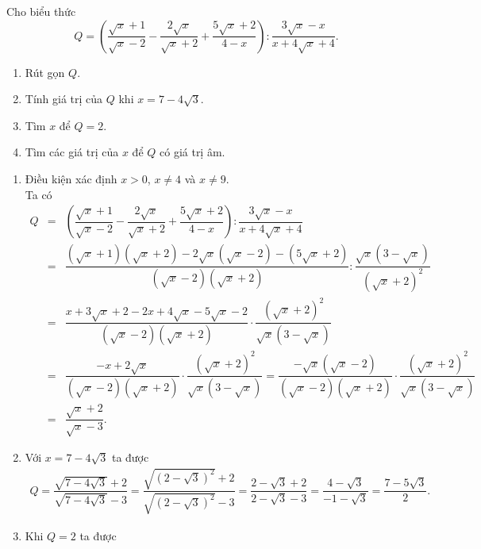 \begin{bt}%
	Cho biểu thức
	$$Q=\left(\dfrac{\sqrt{x}+1}{\sqrt{x}-2} - \dfrac{2\sqrt{x}}{\sqrt{x}+2} + \dfrac{5\sqrt{x}+2}{4-x}\right) : \dfrac{3\sqrt{x}-x}{x+4\sqrt{x}+4}.$$
	\begin{enumerate}
		\item Rút gọn $Q$.
		\item Tính giá trị của $Q$ khi $x=7-4\sqrt{3}$.
		\item Tìm $x$ để $Q=2$.
		\item Tìm các giá trị của $x$ để $Q$ có giá trị âm.
	\end{enumerate}
	\loigiai
	{
		\begin{enumerate}
			\item Điều kiện xác định $x>0$, $x \neq 4$ và $x \neq 9$.\\
			Ta có
			\allowdisplaybreaks
			\begin{eqnarray*}
				Q &=& \left(\dfrac{\sqrt{x}+1}{\sqrt{x}-2} - \dfrac{2\sqrt{x}}{\sqrt{x}+2} + \dfrac{5\sqrt{x}+2}{4-x}\right) : \dfrac{3\sqrt{x}-x}{x+4\sqrt{x}+4}\\
				&=& \dfrac{\left(\sqrt{x}+1\right)\left(\sqrt{x}+2\right) - 2\sqrt{x}\left(\sqrt{x}-2\right) - \left(5\sqrt{x}+2\right)}{\left(\sqrt{x}-2\right)\left(\sqrt{x}+2\right)} : \dfrac{\sqrt{x}\left(3-\sqrt{x}\right)}{\left(\sqrt{x}+2\right)^2}\\
				&=& \dfrac{x+3\sqrt{x}+2 - 2x+4\sqrt{x} - 5\sqrt{x}-2}{\left(\sqrt{x}-2\right)\left(\sqrt{x}+2\right)} \cdot \dfrac{\left(\sqrt{x}+2\right)^2}{\sqrt{x}\left(3-\sqrt{x}\right)}\\
				&=& \dfrac{-x+2\sqrt{x}}{\left(\sqrt{x}-2\right)\left(\sqrt{x}+2\right)} \cdot \dfrac{\left(\sqrt{x}+2\right)^2}{\sqrt{x}\left(3-\sqrt{x}\right)} = \dfrac{-\sqrt{x}\left(\sqrt{x}-2\right)}{\left(\sqrt{x}-2\right)\left(\sqrt{x}+2\right)} \cdot \dfrac{\left(\sqrt{x}+2\right)^2}{\sqrt{x}\left(3-\sqrt{x}\right)}\\
				&=& \dfrac{\sqrt{x}+2}{\sqrt{x}-3}.
			\end{eqnarray*}
			\item Với $x=7-4\sqrt{3}$ ta được
			\allowdisplaybreaks
			\begin{eqnarray*}
				Q = \dfrac{\sqrt{7-4\sqrt{3}}+2}{\sqrt{7-4\sqrt{3}}-3} = \dfrac{\sqrt{\left(2-\sqrt{3}\right)^2}+2}{\sqrt{\left(2-\sqrt{3}\right)^2}-3} = \dfrac{2-\sqrt{3}+2}{2-\sqrt{3}-3} = \dfrac{4-\sqrt{3}}{-1-\sqrt{3}} = \dfrac{7-5\sqrt{3}}{2}.
			\end{eqnarray*}
			\item Khi $Q=2$ ta được

\end{enumerate}}
\end{bt}
